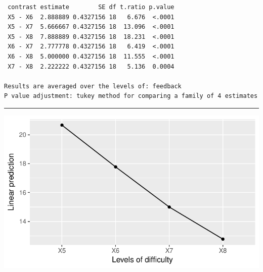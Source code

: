 \documentclass[]{article}
\newenvironment{Shaded}{\begin{snugshade}}{\end{snugshade}}
\newcommand{\KeywordTok}[1]{\textcolor[rgb]{0.13,0.29,0.53}{\textbf{#1}}}
\newcommand{\DataTypeTok}[1]{\textcolor[rgb]{0.13,0.29,0.53}{#1}}
\newcommand{\StringTok}[1]{\textcolor[rgb]{0.31,0.60,0.02}{#1}}
\newcommand{\CommentTok}[1]{\textcolor[rgb]{0.56,0.35,0.01}{\textit{#1}}}
\newcommand{\OperatorTok}[1]{\textcolor[rgb]{0.81,0.36,0.00}{\textbf{#1}}}
\newcommand{\NormalTok}[1]{#1}
\begin{document}
\clearpage

\begin{Shaded}
\end{Shaded}

\begin{verbatim}
 contrast estimate        SE df t.ratio p.value
 X5 - X6  2.888889 0.4327156 18   6.676  <.0001
 X5 - X7  5.666667 0.4327156 18  13.096  <.0001
 X5 - X8  7.888889 0.4327156 18  18.231  <.0001
 X6 - X7  2.777778 0.4327156 18   6.419  <.0001
 X6 - X8  5.000000 0.4327156 18  11.555  <.0001
 X7 - X8  2.222222 0.4327156 18   5.136  0.0004

Results are averaged over the levels of: feedback 
P value adjustment: tukey method for comparing a family of 4 estimates 
\end{verbatim}

\begin{center}\rule{0.5\linewidth}{\linethickness}\end{center}

\begin{Shaded}
\end{Shaded}

\begin{center}\includegraphics{Unit_5_assignment_KEY_R__spr18__files/figure-latex/unnamed-chunk-67-1} \end{center}
\end{document}
